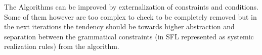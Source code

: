 The Algorithms can be improved by externalization of constraints and conditions. Some of them however are too complex to check to be completely removed but in the next iterations the tendency should be towards higher abstraction and separation between the grammatical constraints (in SFL represented as systemic realization rules) from the algorithm.
